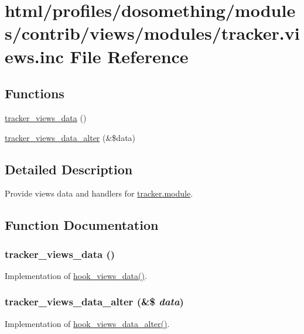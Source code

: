 \hypertarget{tracker_8views_8inc}{
\section{html/profiles/dosomething/modules/contrib/views/modules/tracker.views.inc File Reference}
\label{tracker_8views_8inc}
}
\subsection*{Functions}
\begin{DoxyCompactItemize}
\item 
\hyperlink{tracker_8views_8inc_a119ad3c35f2ba8b782b9e53ca09a337b}{tracker\_\-views\_\-data} ()
\item 
\hyperlink{tracker_8views_8inc_ab88fc2f93900ef43c9f5ef2bc54603a6}{tracker\_\-views\_\-data\_\-alter} (\&\$data)
\end{DoxyCompactItemize}


\subsection{Detailed Description}
Provide views data and handlers for \hyperlink{tracker_8module}{tracker.module}. 

\subsection{Function Documentation}
\hypertarget{tracker_8views_8inc_a119ad3c35f2ba8b782b9e53ca09a337b}{
\subsubsection[{tracker\_\-views\_\-data}]{\setlength{\rightskip}{0pt plus 5cm}tracker\_\-views\_\-data ()}}
\label{tracker_8views_8inc_a119ad3c35f2ba8b782b9e53ca09a337b}
Implementation of \hyperlink{group__views__hooks_ga227057901681e4a33e33c199c7a8c989}{hook\_\-views\_\-data()}. \hypertarget{tracker_8views_8inc_ab88fc2f93900ef43c9f5ef2bc54603a6}{
\subsubsection[{tracker\_\-views\_\-data\_\-alter}]{\setlength{\rightskip}{0pt plus 5cm}tracker\_\-views\_\-data\_\-alter (\&\$ {\em data})}}
\label{tracker_8views_8inc_ab88fc2f93900ef43c9f5ef2bc54603a6}
Implementation of \hyperlink{group__views__hooks_ga6ae0bb0d2385e03c32b57625b6d35826}{hook\_\-views\_\-data\_\-alter()}. 